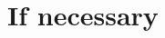 \documentclass[fleqn,usenatbib]{mnras}
\begin{document}










\appendix

\section{If necessary}
\label{app:A}





\bsp	%
\label{lastpage}
\end{document}
